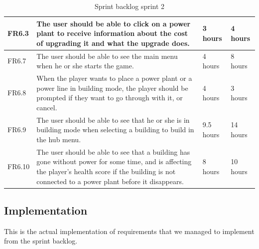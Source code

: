 \begin{table}[H]
\begin{tabular}{| p{1cm} | p{7cm} | p{2cm} | p{2cm} |}
		FR6.3 & The user should be able to click on a power plant to receive information about 
		the cost of upgrading it and what the upgrade does. 
		& 3 hours & 4 hours \\ \hline

		FR6.7 & The user should be able to see the main menu when he or she starts the game. 
		& 4 hours & 8 hours \\ \hline

		FR6.8 & When the player wants to place a power plant or a power line in building mode, 
		the player should be prompted if they want to go through with it, or cancel. 
		& 4 hours & 3 hours \\ \hline

		FR6.9 & The user should be able to see that he or she is in building mode when selecting 
		a building to build in the hub menu. 
		& 9.5 hours & 14 hours \\ \hline

		FR6.10 & The user should be able to see that a building has gone without power for 
		some time, and is affecting the player's health score if the building is not connected 
		to a power plant before it disappears. 
		& 8 hours & 10 hours \\ \hline
	\end{tabular}
	\caption{Sprint backlog sprint 2}
	\end{table}

\subsection{Implementation}
	
	This is the actual implementation of requirements that we managed to implement
	from the sprint backlog.
	
